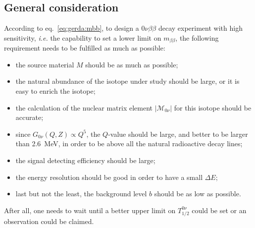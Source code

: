 \subsection{General consideration}
\label{sec:gerda:gencon}
According to eq.~\ref{eq:gerda:mbb}, to design a $0\nu\beta\beta$ decay experiment with high sensitivity, \textit{i.e.} the capability to set a lower limit on $m_{\beta\beta}$, the following requirement needs to be fulfilled as much as possible:
\begin{itemize}
\item the source material $M$ should be as much as possible;
\item the natural abundance of the isotope under study should be large, or it is easy to enrich the isotope;
\item the calculation of the nuclear matrix element $|\mathcal{M}_{0\nu}|$ for this isotope should be accurate;
\item since $G_{0\nu}(Q,Z) \propto Q^{5}$, the $Q$-value should be large, and better to be larger than 2.6~MeV, in order to be above all the natural radioactive decay lines;
\item the signal detecting efficiency should be large;
\item the energy resolution should be good in order to have a small $\Delta E$;
\item last but not the least, the background level $b$ should be as low as possible.
\end{itemize}
After all, one needs to wait until a better upper limit on $T^{0\nu}_{1/2}$ could be set or an observation could be claimed.

